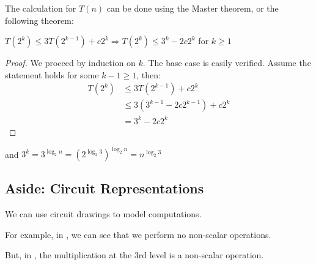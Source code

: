 The calculation for $T(n)$ can be done using the Master theorem, or the following theorem:
\begin{theorem}
    $T(2^k) \leq 3T(2^{k-1}) + c2^k \Rightarrow T(2^k) \leq 3^k - 2c2^k$ for $k \geq 1$
\end{theorem}
\begin{proof}
    We proceed by induction on $k$. The base case is easily verified. Assume the statement holds for some $k-1 \geq 1$, then:
    \begin{align*}
        T(2^k) &\leq 3T(2^{k-1}) + c2^k \\
        &\leq 3(3^{k-1} - 2c2^{k-1}) + c2^k \\
        &= 3^k - 2c2^k
    \end{align*}
\end{proof}
and $3^k = 3^{\log_2 n} = (2^{\log_2 3})^{\log_2 n} = n^{\log_2 3}$

\subsection{Aside: Circuit Representations}
We can use circuit drawings to model computations.

For example, in , we can see that we perform no non-scalar operations.

But, in , the multiplication at the 3rd level is a non-scalar operation.

